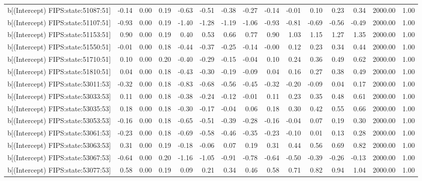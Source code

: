 \begin{table}[ht]
\begin{tabular}{rrrrrrrrrrrrrrr}
  b[(Intercept) FIPS:state:51087:51] & -0.14 & 0.00 & 0.19 & -0.63 & -0.51 & -0.38 & -0.27 & -0.14 & -0.01 & 0.10 & 0.23 & 0.34 & 2000.00 & 1.00 \\ 
  b[(Intercept) FIPS:state:51107:51] & -0.93 & 0.00 & 0.19 & -1.40 & -1.28 & -1.19 & -1.06 & -0.93 & -0.81 & -0.69 & -0.56 & -0.49 & 2000.00 & 1.00 \\ 
  b[(Intercept) FIPS:state:51153:51] & 0.90 & 0.00 & 0.19 & 0.40 & 0.53 & 0.66 & 0.77 & 0.90 & 1.03 & 1.15 & 1.27 & 1.35 & 2000.00 & 1.00 \\ 
  b[(Intercept) FIPS:state:51550:51] & -0.01 & 0.00 & 0.18 & -0.44 & -0.37 & -0.25 & -0.14 & -0.00 & 0.12 & 0.23 & 0.34 & 0.44 & 2000.00 & 1.00 \\ 
  b[(Intercept) FIPS:state:51710:51] & 0.10 & 0.00 & 0.20 & -0.40 & -0.29 & -0.15 & -0.04 & 0.10 & 0.24 & 0.36 & 0.49 & 0.62 & 2000.00 & 1.00 \\ 
  b[(Intercept) FIPS:state:51810:51] & 0.04 & 0.00 & 0.18 & -0.43 & -0.30 & -0.19 & -0.09 & 0.04 & 0.16 & 0.27 & 0.38 & 0.49 & 2000.00 & 1.00 \\ 
  b[(Intercept) FIPS:state:53011:53] & -0.32 & 0.00 & 0.18 & -0.83 & -0.68 & -0.56 & -0.45 & -0.32 & -0.20 & -0.09 & 0.04 & 0.17 & 2000.00 & 1.00 \\ 
  b[(Intercept) FIPS:state:53033:53] & 0.11 & 0.00 & 0.18 & -0.38 & -0.24 & -0.12 & -0.01 & 0.11 & 0.23 & 0.35 & 0.48 & 0.61 & 2000.00 & 1.00 \\ 
  b[(Intercept) FIPS:state:53035:53] & 0.18 & 0.00 & 0.18 & -0.30 & -0.17 & -0.04 & 0.06 & 0.18 & 0.30 & 0.42 & 0.55 & 0.66 & 2000.00 & 1.00 \\ 
  b[(Intercept) FIPS:state:53053:53] & -0.16 & 0.00 & 0.18 & -0.65 & -0.51 & -0.39 & -0.28 & -0.16 & -0.04 & 0.07 & 0.19 & 0.30 & 2000.00 & 1.00 \\ 
  b[(Intercept) FIPS:state:53061:53] & -0.23 & 0.00 & 0.18 & -0.69 & -0.58 & -0.46 & -0.35 & -0.23 & -0.10 & 0.01 & 0.13 & 0.28 & 2000.00 & 1.00 \\ 
  b[(Intercept) FIPS:state:53063:53] & 0.31 & 0.00 & 0.19 & -0.18 & -0.06 & 0.07 & 0.19 & 0.31 & 0.44 & 0.56 & 0.69 & 0.82 & 2000.00 & 1.00 \\ 
  b[(Intercept) FIPS:state:53067:53] & -0.64 & 0.00 & 0.20 & -1.16 & -1.05 & -0.91 & -0.78 & -0.64 & -0.50 & -0.39 & -0.26 & -0.13 & 2000.00 & 1.00 \\ 
  b[(Intercept) FIPS:state:53077:53] & 0.58 & 0.00 & 0.19 & 0.09 & 0.21 & 0.34 & 0.46 & 0.58 & 0.71 & 0.82 & 0.94 & 1.04 & 2000.00 & 1.00 \\ 

\end{tabular}
\end{table}
